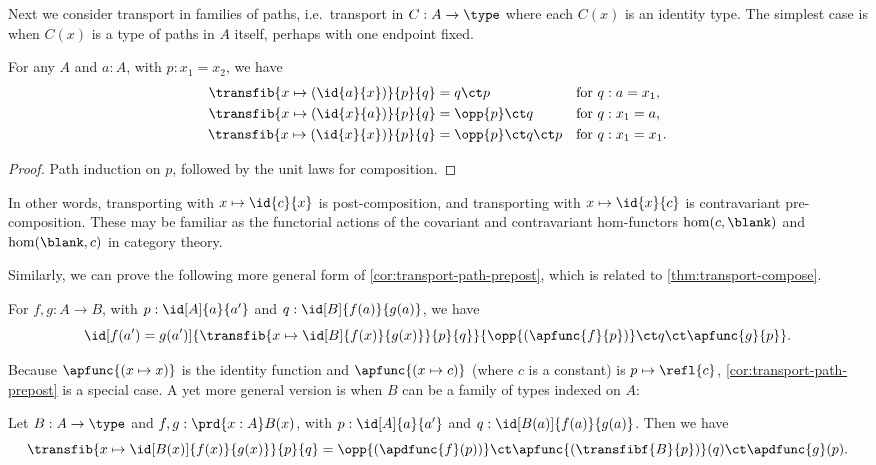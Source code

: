 %
Next we consider transport in families of paths, i.e.\ transport in $C:A\to\type$ where each $C(x)$ is an identity type.
The simplest case is when $C(x)$ is a type of paths in $A$ itself, perhaps with one endpoint fixed.

\begin{lem}\label{cor:transport-path-prepost}
  For any $A$ and $a:A$, with $p:x_1=x_2$, we have
  \begin{align*}
    \transfib{x \mapsto (\id{a}{x})} {p} {q} &= q \ct p
    & &\text{for $q:a=x_1$,}\\
    \transfib{x \mapsto (\id{x}{a})} {p} {q} &= \opp {p} \ct q
    & &\text{for $q:x_1=a$,}\\
    \transfib{x \mapsto (\id{x}{x})} {p} {q} &= \opp{p} \ct q \ct p
    & &\text{for $q:x_1=x_1$.}
  \end{align*}
\end{lem}
\begin{proof}
  Path induction on $p$, followed by the unit laws for composition.
\end{proof}

In other words, transporting with ${x \mapsto \id{c}{x}}$ is post-composition, and transporting with ${x \mapsto \id{x}{c}}$ is contravariant pre-composition.
These may be familiar as the functorial actions of the covariant and contravariant hom-functors $\hom(c, {\blank})$ and $\hom({\blank},c)$ in category theory.

\sloppy
Similarly, we can prove the following more general form of \cref{cor:transport-path-prepost}, which is related to \cref{thm:transport-compose}.

\begin{thm}\label{thm:transport-path}
  For $f,g:A\to B$, with $p : \id[A]{a}{a'}$ and $q : \id[B]{f(a)}{g(a)}$, we have
  \begin{equation*}
    \id[f(a') = g(a')]{\transfib{x \mapsto \id[B]{f(x)}{g(x)}}{p}{q}}
    {\opp{(\apfunc{f}{p})} \ct q \ct \apfunc{g}{p}}.
  \end{equation*}
\end{thm}

Because $\apfunc{(x \mapsto x)}$ is the identity function and $\apfunc{(x \mapsto c)}$ (where $c$ is a constant) is $p \mapsto\refl{c}$, \cref{cor:transport-path-prepost} is a special case.
A yet more general version is when $B$ can be a family of types indexed on $A$:

\begin{thm}\label{thm:transport-path2}
  Let $B : A \to \type$ and $f,g : \prd{x:A} B(x)$, with $p : \id[A]{a}{a'}$ and $q : \id[B(a)]{f(a)}{g(a)}$.
  Then we have
  \begin{equation*}
    \transfib{x \mapsto \id[B(x)]{f(x)}{g(x)}}{p}{q} =
    \opp{(\apdfunc{f}(p))} \ct \apfunc{(\transfibf{B}{p})}(q) \ct \apdfunc{g}(p).
  \end{equation*}
\end{thm}

